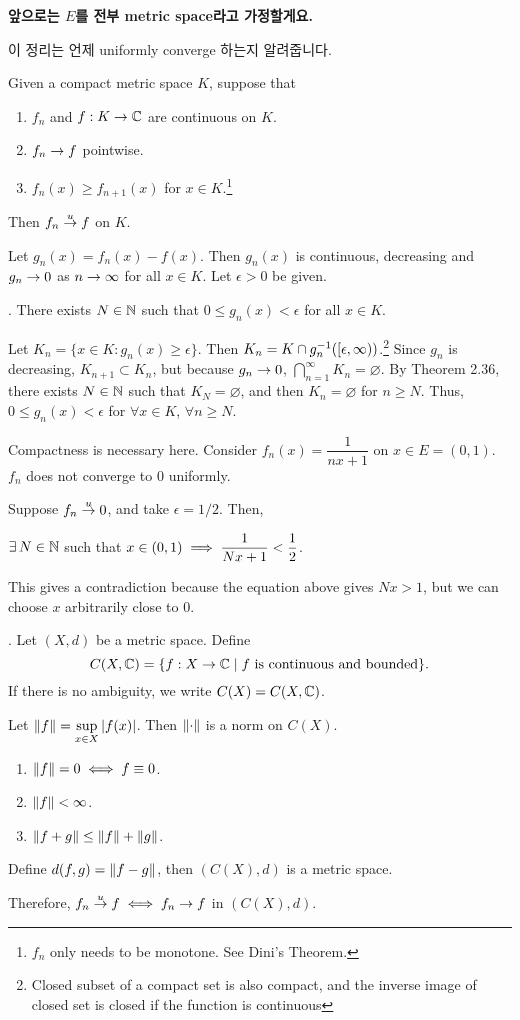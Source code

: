 \textbf{앞으로는 \(E\)를 전부 metric space라고 가정할게요.}

이 정리는 언제 uniformly converge 하는지 알려줍니다.

 Given a compact metric space \(K\), suppose that
\begin{enumerate}
    \item \(f_n\) and \(f: K \rightarrow \mathbb{C}\) are continuous on \(K\).
    \item \(f_n \rightarrow f\) pointwise.
    \item \(f_n(x) \geq f_{n+1}(x)\) for \(x \in K\).\footnote{\(f_n\) only needs to be monotone. See Dini's Theorem.}
\end{enumerate}
Then \(f_n \overset{u}{\rightarrow} f\) on \(K\).

\pf Let \(g_n(x) = f_n(x) - f(x)\). Then \(g_n(x)\) is continuous, decreasing and \(g_n \rightarrow 0\) as \(n \rightarrow \infty\) for all \(x \in K\). Let \(\epsilon > 0\) be given.

\quad \claim. There exists \(N \in \mathbb{N}\) such that \(0 \leq g_n(x) < \epsilon\) for all \(x \in K\).

\quad \pf Let \(K_n = \{x \in K : g_n(x)\geq \epsilon\}\). Then \(K_n = K \cap g_n^{-1} ([\epsilon, \infty))\).\footnote{Closed subset of a compact set is also compact, and the inverse image of closed set is closed if the function is continuous} Since \(g_n\) is decreasing, \(K_{n+1}\subset K_n\), but because \(g_n \rightarrow 0\), \(\bigcap_{n=1}^\infty K_n = \varnothing\). By Theorem 2.36, there exists \(N \in \mathbb{N}\) such that \(K_N = \varnothing\), and then \(K_n = \varnothing\) for \(n \geq N\). Thus, \(0 \leq g_n(x) < \epsilon\) for \(\forall x \in K\), \(\forall n \geq N\).

\rmk Compactness is necessary here. Consider \(f_n(x) = \dfrac{1}{nx + 1}\) on \(x \in E = (0, 1)\). \(f_n\) does not converge to \(0\) uniformly.

\pf Suppose \(f_n \overset{u}{\rightarrow} 0\), and take \(\epsilon = 1/2\). Then,
\begin{center}
    \(\exists N \in \N\) such that \(\displaystyle x \in (0, 1) \implies \frac{1}{Nx + 1} < \frac{1}{2}\).
\end{center}
This gives a contradiction because the equation above gives \(Nx > 1\), but we can choose \(x\) arbitrarily close to \(0\).

. Let \((X, d)\) be a metric space. Define
\[
    C(X, \mathbb{C}) = \{f: X \rightarrow \mathbb{C} \mid f\text{ is continuous and bounded}\}.
\]
If there is no ambiguity, we write \(C(X) = C(X, \mathbb{C})\).

Let \(\left\lVert f \right\rVert = \displaystyle \sup_{x\in X} \left| f(x) \right|\). Then \(\left\lVert \cdot \right\rVert\) is a norm on \(C(X)\).
\begin{enumerate}
    \item \(\left\lVert f \right\rVert = 0 \iff f \equiv 0\).
    \item \(\left\lVert f \right\rVert < \infty\).
    \item \(\left\lVert f + g \right\rVert \leq \left\lVert f \right\rVert + \left\lVert g \right\rVert\).
\end{enumerate}
Define \(d(f, g) = \left\lVert f - g \right\rVert\), then \((C(X), d)\) is a metric space.

Therefore, \(f_n \overset{u}{\rightarrow} f \iff f_n \rightarrow f\) in \((C(X), d)\).
